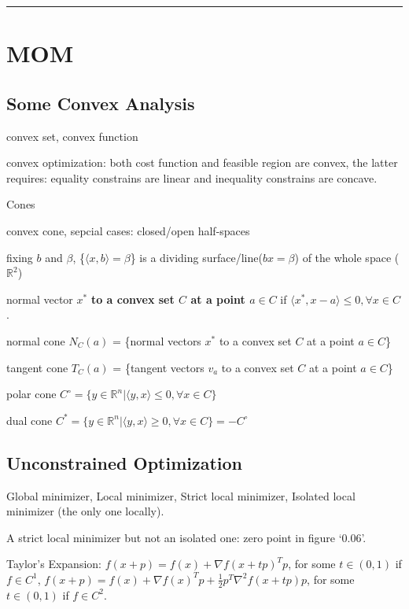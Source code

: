 \vspace{5pt} \hrule \vspace{5pt}

\chapter{MOM}

\section{Some Convex Analysis}

convex set, convex function

convex optimization: both cost function and feasible region are convex, the latter requires: equality constrains are linear and inequality constrains are concave.

Cones

convex cone, sepcial cases: closed/open half-spaces

fixing $b$ and $\beta$, \{$\langle  x, b \rangle = \beta$\} is a dividing surface/line($bx = \beta$) of the whole space ($\mathbb{R}^2$)

normal vector $x^{\ast}$ \textbf{to a convex set $C$ at a point $a \in C$} if $\langle x^{\ast}, x - a \rangle \le 0, \forall x \in C$.

normal cone $N_C (a)$ = \{normal vectors $x^{\ast}$ to a convex set $C$ at a point $a \in C$\}

tangent cone $T_C (a)$ = \{tangent vectors $v_a$ to a convex set $C$ at a point $a \in C$\}

polar cone $C^{\circ} = \{y \in \mathbb{R}^n | \langle y, x \rangle \le 0, \forall x \in C\}$

dual cone $C^{\ast} = \{y \in \mathbb{R}^n | \langle y, x \rangle \ge 0, \forall x \in C\} = - C^{\circ}$

\section{Unconstrained Optimization}

Global minimizer, Local minimizer, Strict local minimizer, Isolated local minimizer (the only one locally).

A strict local minimizer but not an isolated one: zero point in figure `0.06'.

Taylor's Expansion: $f(x+p)=f(x)+\nabla f(x+t p)^{T} p$, for some $t \in(0,1)$ if $f \in C^1$, $f(x+p)=f(x)+\nabla f(x)^{T} p+\frac{1}{2} p^{T} \nabla^{2} f(x+t p) p$, for some $t \in(0,1)$ if $f \in C^2$.

